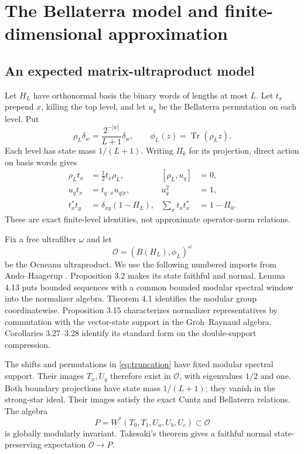 \section{The Bellaterra model and finite-dimensional approximation}\label{sec:approximation}
\subsection{An expected matrix-ultraproduct model}
Let $H_L$ have orthonormal basis the binary words of lengths at most $L$. Let $t_x$ prepend $x$, killing the top level, and let $u_q$ be the Bellaterra permutation on each level. Put
\[
 \rho_L\delta_w=\frac{2^{-|w|}}{L+1}\delta_w,\qquad
 \phi_L(z)=\operatorname{Tr}(\rho_Lz).
\]
Each level has state mass $1/(L+1)$. Writing $\Pi_k$ for its projection, direct action on basis words gives
\begin{equation}\label{eq:truncation}
\begin{aligned}
 \rho_Lt_x&=\tfrac12t_x\rho_L,&[\rho_L,u_q]&=0,\\
 u_qt_x&=t_{q\cdot x}u_{q|x},&u_q^2&=1,\\
 t_x^*t_y&=\delta_{xy}(1-\Pi_L),&
 \sum_xt_xt_x^*&=1-\Pi_0.
\end{aligned}
\end{equation}
These are exact finite-level identities, not approximate operator-norm relations.

Fix a free ultrafilter $\omega$ and let
\[
 \mathcal O=(B(H_L),\phi_L)^\omega
\]
be the Ocneanu ultraproduct. We use the following numbered imports from Ando--Haagerup \cite{AH}. Proposition 3.2 makes its state faithful and normal. Lemma 4.13 puts bounded sequences with a common bounded modular spectral window into the normalizer algebra. Theorem 4.1 identifies the modular group coordinatewise. Proposition 3.15 characterizes normalizer representatives by commutation with the vector-state support in the Groh--Raynaud algebra. Corollaries 3.27--3.28 identify its standard form on the double-support compression.

The shifts and permutations in \eqref{eq:truncation} have fixed modular spectral support. Their images $T_x,U_q$ therefore exist in $\mathcal O$, with eigenvalues $1/2$ and one. Both boundary projections have state mass $1/(L+1)$; they vanish in the strong-star ideal. Their images satisfy the exact Cuntz and Bellaterra relations. The algebra
\[
 P=W^*(T_0,T_1,U_a,U_b,U_c)\subset\mathcal O
\]
is globally modularly invariant. Takesaki's theorem gives a faithful normal state-preserving expectation $\mathcal O\to P$.


